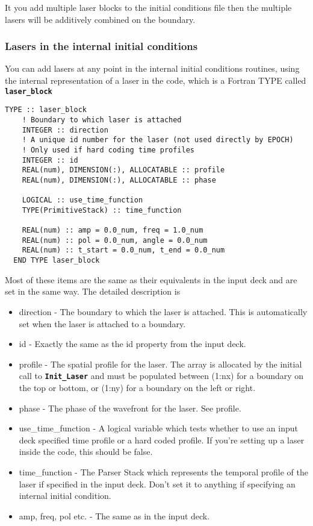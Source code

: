 \documentclass[12pt,a4paper]{article}
\newcommand{\simpleboxverbatim}{\begin{Verbatim}[obeytabs=true,frame=single,
  framerule=0.5mm,rulecolor=\color{warwickmid},formatcom=\color{black}]}
\newcommand{\inlinecode}[1]{{\color{warwickred} \bf\texttt{#1}}}
\begin{document}
It you add multiple laser blocks to the initial conditions file then the
multiple lasers will be additively combined on the boundary.

\subsubsection{Lasers in the internal initial conditions}
You can add lasers at any point in the internal initial conditions routines,
using the internal representation of a laser in the code, which is a Fortran
TYPE called \inlinecode{laser\_block}
\simpleboxverbatim
  TYPE :: laser_block
    ! Boundary to which laser is attached
    INTEGER :: direction
    ! A unique id number for the laser (not used directly by EPOCH)
    ! Only used if hard coding time profiles
    INTEGER :: id
    REAL(num), DIMENSION(:), ALLOCATABLE :: profile
    REAL(num), DIMENSION(:), ALLOCATABLE :: phase

    LOGICAL :: use_time_function
    TYPE(PrimitiveStack) :: time_function

    REAL(num) :: amp = 0.0_num, freq = 1.0_num
    REAL(num) :: pol = 0.0_num, angle = 0.0_num
    REAL(num) :: t_start = 0.0_num, t_end = 0.0_num
  END TYPE laser_block
\end{Verbatim}
Most of these items are the same as their equivalents in the input deck and
are set in the same way. The detailed description is
\begin{itemize}
\item direction - The boundary to which the laser is attached. This is
  automatically set when the laser is attached to a boundary.
\item id - Exactly the same as the id property from the input deck.
\item profile - The spatial profile for the laser. The array is allocated by
  the initial call to \inlinecode{Init\_Laser} and must be populated between
  (1:nx) for a boundary on the top or bottom, or (1:ny) for a boundary on the
  left or right.
\item phase - The phase of the wavefront for the laser. See profile.
\item use\_time\_function - A logical variable which tests whether to use an
  input deck specified time profile or a hard coded profile. If you're setting
  up a laser inside the code, this should be false.
\item time\_function - The Parser Stack which represents the temporal profile of
  the laser if specified in the input deck. Don't set it to anything if
  specifying an internal initial condition.
\item amp, freq, pol etc. - The same as in the input deck.
\end{itemize}
\end{document}
